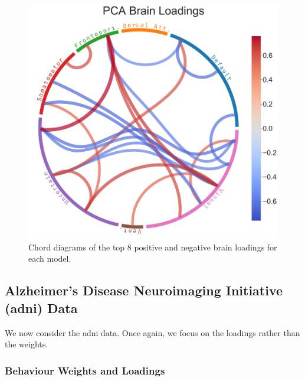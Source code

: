 \begin{figure}
\includegraphics[width=0.49\linewidth]{figures/hcp/PCA brain loadings}
\caption{Chord diagrams of the top 8 positive and negative brain \gls{loadings} for each model.}\label{fig:chord_loadings}
\end{figure}

\newpage
\subsection{Alzheimer's Disease Neuroimaging Initiative (\acrshort{adni}) Data}

We now consider the \acrshort{adni} data.
Once again, we focus on the \gls{loadings} rather than the weights.

\subsubsection{Behaviour Weights and Loadings}



